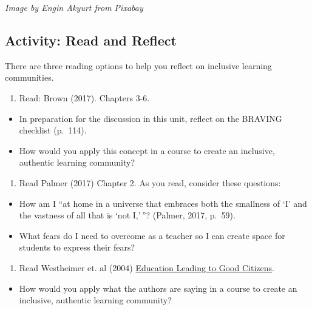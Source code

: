 \documentclass[
]{book}
\providecommand{\tightlist}{%
  \setlength{\itemsep}{0pt}\setlength{\parskip}{0pt}}
\begin{document}
\emph{Image by Engin Akyurt from Pixabay}

\hypertarget{activity-read-and-reflect}{%
\subsection{Activity: Read and Reflect}\label{activity-read-and-reflect}}

\begin{reflect}
There are three reading options to help you reflect on inclusive
learning communities.

\begin{enumerate}
\def\labelenumi{\arabic{enumi}.}
\tightlist
\item
  Read: Brown (2017). Chapters 3-6.
\end{enumerate}

\begin{itemize}
\tightlist
\item
  In preparation for the discussion in this unit, reflect on the BRAVING
  checklist (p.~114).
\item
  How would you apply this concept in a course to create an inclusive,
  authentic learning community?
\end{itemize}

\begin{enumerate}
\def\labelenumi{\arabic{enumi}.}
\setcounter{enumi}{1}
\tightlist
\item
  Read Palmer (2017) Chapter 2. As you read, consider these questions:
\end{enumerate}

\begin{itemize}
\tightlist
\item
  How am I ``at home in a universe that embraces both the smallness of
  `I' and the vastness of all that is `not I,'\,''? (Palmer, 2017,
  p.~59).
\item
  What fears do I need to overcome as a teacher so I can create space
  for students to express their fears?
\end{itemize}

\begin{enumerate}
\def\labelenumi{\arabic{enumi}.}
\setcounter{enumi}{2}
\tightlist
\item
  Read Westheimer et. al (2004)
  \href{assets/unit3/Westheimer.pdf}{Education Leading to Good
  Citizens}.\\
\end{enumerate}

\begin{itemize}
\tightlist
\item
  How would you apply what the authors are saying in a course to create
  an inclusive, authentic learning community?
\end{itemize}
\end{reflect}
\end{document}
